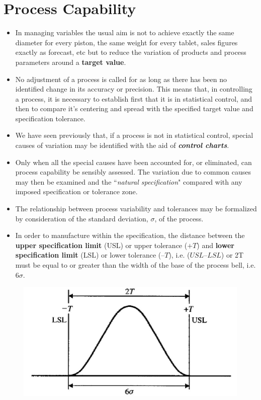 \documentclass[MASTER-SPC.tex]{subfiles}
\begin{document}
\large
\section{Process Capability}
\begin{itemize}
\item In managing variables the usual aim is not to achieve exactly the same diameter for every piston, the same weight for every tablet, sales figures exactly as forecast, etc but to reduce the variation of products and process parameters around a \textbf{target value}. 
	
\item No adjustment of a process is called for as long as there has been no identified change in its accuracy or precision. This means that, in controlling a process, it is necessary to establish first that it is in statistical control, and then to compare it’s centering and spread with the specified target value and specification tolerance.
	
\item We have seen previously that, if a process is not in statistical control, special causes of variation may be identified with the aid of \textbf{\textit{control charts}}. 
	
\item Only when all the special causes have been accounted for, or
	eliminated, can process capability be sensibly assessed. The variation due to common causes may then be examined and the ``\textit{natural specification}" compared with any imposed specification or tolerance zone.
\item The relationship between process variability and tolerances may be formalized by consideration of the standard deviation, $\sigma$, of the process. 
	
	\item In order to manufacture within the specification, the distance between the \textbf{upper specification limit} (USL) or upper tolerance ($+T$) and \textbf{lower specification limit} (LSL) or lower tolerance ($–T$), i.e. ($USL–LSL$) or 2T must be equal to or greater than the width of the base of the process bell, i.e. $6\sigma$.
\end{itemize}

	

	
	\begin{figure}[h!]
		\centering
		\includegraphics[width=0.8\linewidth]{proccapindices/image1}
	\end{figure}
	
\end{document}
